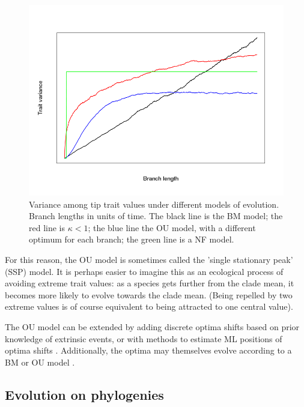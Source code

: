\documentclass[12pt]{article}
\begin{document}
\begin{figure}[!ht]
	\begin{center}
	\includegraphics[width=6in]{figures/var}
	\end{center}
	\vspace{-40pt}	
	\caption{
		Variance among tip trait values under different models of evolution. Branch lengths in units of time. The black line is the BM model; the red line is $\kappa < 1$; the blue line the OU model, with a different optimum for each branch; the green line is a NF model.
	}
	\label{Figure_label}
\end{figure}
\vspace{20pt}

For this reason, the OU model is sometimes called the 'single stationary peak' (SSP) model.
It is perhaps easier to imagine this as an ecological process of avoiding extreme trait values: as a species gets further from the clade mean, it becomes more likely to evolve towards the clade mean. 
(Being repelled by two extreme values is of course equivalent to being attracted to one central value).

The OU model can be extended by adding discrete optima shifts based on prior knowledge of extrinsic events, or with  methods to estimate ML positions of optima shifts \citep{hansen_stabilizing_1997,hansen_assessing_2005}. 
Additionally, the optima may themselves evolve according to a BM or OU model \cite{hansen_measuring_2008,hansen_interpreting_2012}. 

\subsection{Evolution on phylogenies}
\end{document}
